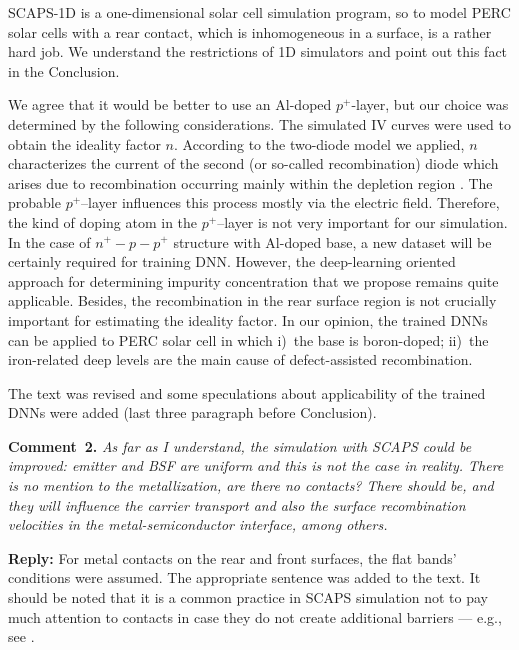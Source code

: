 \documentclass[num-refs]{wiley-article} %
\begin{document}
SCAPS-1D is a one-dimensional solar cell simulation program, so to model PERC solar cells with a rear contact,
which is inhomogeneous in a surface, is a rather hard job.
We understand the restrictions of 1D simulators and point out this fact in the Conclusion.

We agree that it would be better to use an Al-doped $p^+$-layer, but our choice was determined by the following considerations.
The simulated IV curves were used to obtain the ideality factor $n$.
According to the two-diode model we applied,
$n$ characterizes the current of the second (or so-called recombination) diode
which arises due to recombination occurring mainly within the depletion region \citep{Breitenstein2013,n2McIntosh}.
The probable $p^+$--layer influences this process mostly via the electric field.
Therefore, the kind of doping atom in the $p^+$--layer is not very important for our simulation.
In the case of $n^+-p-p^+$ structure with Al-doped base,
a new dataset will be certainly required for training DNN.
However, the deep-learning oriented approach for determining impurity concentration that we propose remains quite applicable.
Besides, the recombination in the rear surface region is not crucially important for estimating the ideality factor.
In our opinion, the trained DNNs can be applied to PERC solar cell in which
i)~the base is boron-doped;
ii)~the iron-related deep levels are the main cause of defect-assisted recombination.

The text was revised and some speculations about applicability of the trained DNNs were added (last three paragraph before Conclusion).

\vspace{1cm}
\noindent
\textcolor[rgb]{0.00,0.50,1.00}{\textbf{Comment~2.}}
\emph{As far as I understand, the simulation with SCAPS could be improved: emitter and BSF are uniform and this is not the case in reality.
There is no mention to the metallization, are there no contacts?
There should be, and they will influence the carrier transport and also the surface recombination velocities in the metal-semiconductor interface, among others.}

\vspace{0.5cm}
\noindent
\textcolor[rgb]{0.51,0.00,0.00}{\textbf{Reply:}}
For metal contacts on the rear and front surfaces,
the flat bands' conditions were assumed.
The appropriate sentence was added to the text.
It should be noted that it is a common practice in SCAPS simulation not to pay much attention to contacts
in case they do not create additional barriers --- e.g., see \cite{SCAPSuseSi4,SCAPSuseSi1,SCAPSuse1,SCAPSuse5,ScapsUse10}.
\end{document}
